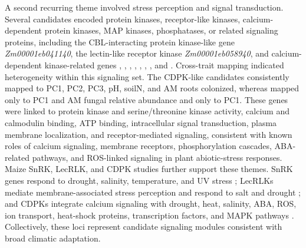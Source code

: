\documentclass[unnumsec,webpdf,contemporary,large]{oup-authoring-template}%
\theoremstyle{thmstyleone}%
\theoremstyle{thmstyletwo}%
\theoremstyle{thmstylethree}%
\begin{document}
A second recurring theme involved stress perception and signal transduction. Several candidates encoded protein kinases, receptor-like kinases, calcium-dependent protein kinases, MAP kinases, phosphatases, or related signaling proteins, including the CBL-interacting protein kinase-like gene \textit{Zm00001eb041140}, the lectin-like receptor kinase \textit{Zm00001eb058940}, and calcium-dependent kinase-related genes \textit{}, \textit{}, \textit{}, \textit{}, \textit{}, \textit{}, \textit{}, and \textit{}. Cross-trait mapping indicated heterogeneity within this signaling set. The CDPK-like candidates consistently mapped to PC1, PC2, PC3, pH, soilN, and AM roots colonized, whereas \textit{} mapped only to PC1 and AM fungal relative abundance and \textit{} only to PC1. These genes were linked to protein kinase and serine/threonine kinase activity, calcium and calmodulin binding, ATP binding, intracellular signal transduction, plasma membrane localization, and receptor-mediated signaling, consistent with known roles of calcium signaling, membrane receptors, phosphorylation cascades, ABA-related pathways, and ROS-linked signaling in plant abiotic-stress responses. Maize SnRK, LecRLK, and CDPK studies further support these themes. SnRK genes respond to drought, salinity, temperature, and UV stress \citep{Feng2022SnRK}; LecRLKs mediate membrane-associated stress perception and respond to salt and drought \citep{Yang2025LecRLK}; and CDPKs integrate calcium signaling with drought, heat, salinity, ABA, ROS, ion transport, heat-shock proteins, transcription factors, and MAPK pathways \citep{Du2023CDPK}. Collectively, these loci represent candidate signaling modules consistent with broad climatic adaptation.






\end{document}
